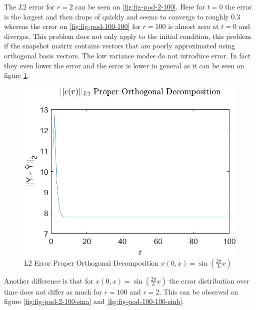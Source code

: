 The \(L2\) error for \(r=2\) can be seen on \ref{fig:fig-pod-2-100}.
Here for \(t=0\) the error is the largest and then drops of quickly and seems to converge to roughly 0.3 whereas the error on \ref{fig:fig-pod-100-100} for \(r=100\) is almost zero at \(t=0\) and diverges.
This problem does not only apply to the initial condition, this problem if the snapshot matrix contains vectors that are poorly approximated using orthogonal basis vectors.
The low variance modes do not introduce error. 
In fact they even lower the error and the error is lower in general as it can be seen on figure \ref{FIG-ERR-POD-SIN}.
\begin{figure}[H]
\centering
\includegraphics[width=12.5cm]{images/L2_POD_SIN}
\caption{L2 Error Proper Orthogonal Decomposition $x(0, x) = \sin(\frac{2\pi}{L}x)$}
\label{FIG-ERR-POD-SIN}
\end{figure}
Another difference is that for $x(0, x) = \sin(\frac{2\pi}{L}x)$ the error distribution over time does not differ as much for \(r=100\) and \(r=2\).
This can be observed on figure \ref{fig:fig-pod-2-100-sina} and \ref{fig:fig-pod-100-100-sinb}.
